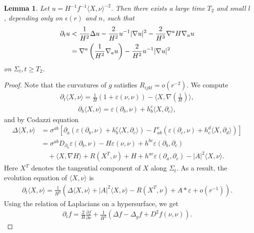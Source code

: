 \documentclass[10pt,a4paper]{amsart}
\newtheorem{lem}{Lemma}
\newcommand{\lt}{\left}
\newcommand{\na}{\nabla}
\newcommand{\pl}{\partial}
\newcommand{\rt}{\right}
\begin{document}
\begin{lem}\label{differential inequality}
Let $u = H^{-1} f^{-1} \langle X,\nu \rangle^{-2}$. Then there exists a large time $T_2$ and small $l$, depending only on $\epsilon(r)$ and $n$, such that 
\begin{align}
\pl_t u &< \frac{1}{H^2}\Delta u - \frac{2}{H^2} u^{-1} |\na u|^2 - \frac{2}{H^3} \na^a H \na_a u \notag\\
&= \na^a \lt( \frac{1}{H^2} \na_a u \rt) - \frac{2}{H^2} u^{-1}|\na u|^2
\end{align}
on $\Sigma_t, t \ge T_2$. 
\end{lem}

\begin{proof}
Note that the curvatures of $g$ satisfies $R_{ijkl} = o(r^{-2})$. We compute
\begin{align*}
\pl_t \langle X,\nu \rangle = \frac{1}{H} \lt( 1 + \varepsilon(\nu,\nu) \rt) - \langle X, \na (\frac{1}{H}) \rangle,
\end{align*}
\begin{align}\label{gradXnu}
\pl_b \langle X,\nu \rangle = \varepsilon(\pl_b, \nu) + h_b^c \langle X,\pl_c \rangle, 
\end{align}
and by Codazzi equation
\begin{align*}
\Delta \langle X,\nu \rangle &= \sigma^{ab} \lt[ \pl_a \lt( \varepsilon(\pl_b, \nu) + h_b^c \langle X,\pl_c \rangle \rt) - \Gamma_{ab}^c \lt( \varepsilon(\pl_c,\nu) + h_c^d \langle X, \pl_d \rangle \rt)\rt]\\
&= \sigma^{ab} D_{\pl_a} \varepsilon (\pl_b,\nu) - H \varepsilon(\nu,\nu) + h^{bc} \varepsilon(\pl_b,\pl_c) \\
&\quad + \langle X,\na H \rangle + R(X^T, \nu) + H + h^{ac} \varepsilon(\pl_a, \pl_c) - |A|^2 \langle X,\nu \rangle.
\end{align*}
Here $X^T$ denotes the tangential component of $X$ along $\Sigma_t$.  As a result, the evolution equation of $\langle X,\nu \rangle$ is 
\begin{align*}
\pl_t \langle X,\nu \rangle = \frac{1}{H^2} \lt( \Delta \langle X,\nu \rangle + |A|^2 \langle X,\nu \rangle - R(X^T,\nu) + A * \varepsilon + o(r^{-1}) \rt).
\end{align*}
Using the relation of Laplacians on a hypersurface, we get 
\begin{align*}
\pl_t f = \frac{2}{H} \frac{\pl f}{\pl\nu} + \frac{1}{H^2} \lt( \Delta f - \Delta_g f + D^2 f(\nu,\nu) \rt).
\end{align*}


\end{proof}
\end{document}
